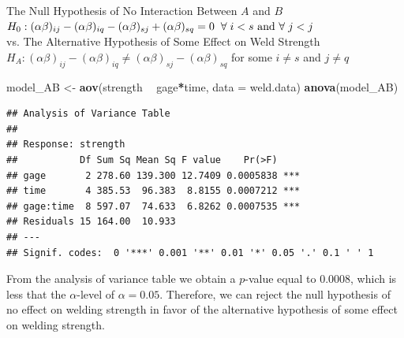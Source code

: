 \documentclass[12pt,]{article}
\newenvironment{Shaded}{\begin{snugshade}}{\end{snugshade}}
\newcommand{\KeywordTok}[1]{\textcolor[rgb]{0.13,0.29,0.53}{\textbf{#1}}}
\newcommand{\DataTypeTok}[1]{\textcolor[rgb]{0.13,0.29,0.53}{#1}}
\newcommand{\StringTok}[1]{\textcolor[rgb]{0.31,0.60,0.02}{#1}}
\newcommand{\OperatorTok}[1]{\textcolor[rgb]{0.81,0.36,0.00}{\textbf{#1}}}
\newcommand{\NormalTok}[1]{#1}
\begin{document}
\begin{center}
 The Null Hypothesis of No Interaction Between $A$ and $B$  
 $H_0 : (\alpha \beta)_{ij} - (\alpha \beta)_{iq} - (\alpha \beta)_{sj} + (\alpha \beta)_{sq}= 0 \hspace{.2cm }\forall \hspace{.1cm} i<s \text{ and }\forall  \hspace{.1cm} j<j$ \\
 vs. The Alternative Hypothesis of Some Effect on Weld Strength $H_A :  (\alpha \beta)_{ij} - (\alpha \beta)_{iq} \neq (\alpha \beta)_{sj} - (\alpha \beta)_{sq}$ for some $i\neq s$ and $j\neq q$ 
\end{center}

\begin{Shaded}
\end{Shaded}

\begin{Shaded}
\begin{Highlighting}[]
\NormalTok{model_AB <-}\StringTok{ }\KeywordTok{aov}\NormalTok{(strength }\OperatorTok{~}\StringTok{ }\NormalTok{gage}\OperatorTok{*}\NormalTok{time, }\DataTypeTok{data =}\NormalTok{ weld.data)}
\KeywordTok{anova}\NormalTok{(model_AB)}
\end{Highlighting}
\end{Shaded}

\begin{verbatim}
## Analysis of Variance Table
## 
## Response: strength
##           Df Sum Sq Mean Sq F value    Pr(>F)    
## gage       2 278.60 139.300 12.7409 0.0005838 ***
## time       4 385.53  96.383  8.8155 0.0007212 ***
## gage:time  8 597.07  74.633  6.8262 0.0007535 ***
## Residuals 15 164.00  10.933                      
## ---
## Signif. codes:  0 '***' 0.001 '**' 0.01 '*' 0.05 '.' 0.1 ' ' 1
\end{verbatim}

From the analysis of variance table we obtain a \(p\)-value equal to
\(0.0008\), which is less that the \(\alpha\)-level of
\(\alpha = 0.05\). Therefore, we can reject the null hypothesis of no
effect on welding strength in favor of the alternative hypothesis of
some effect on welding strength.
\end{document}
